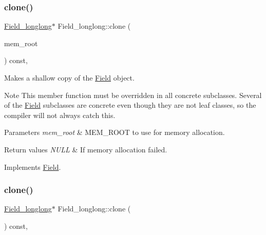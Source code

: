 \subsubsection{\texorpdfstring{clone()}{clone()}\hspace{0.1cm}{\footnotesize\ttfamily [1/2]}}
{\footnotesize\ttfamily \mbox{\hyperlink{classField__longlong}{Field\+\_\+longlong}}$\ast$ Field\+\_\+longlong\+::clone (\begin{DoxyParamCaption}\item[{M\+E\+M\+\_\+\+R\+O\+OT $\ast$}]{mem\+\_\+root }\end{DoxyParamCaption}) const\hspace{0.3cm}{\ttfamily [inline]}, {\ttfamily [virtual]}}

Makes a shallow copy of the \mbox{\hyperlink{classField}{Field}} object.

\begin{DoxyNote}{Note}
This member function must be overridden in all concrete subclasses. Several of the \mbox{\hyperlink{classField}{Field}} subclasses are concrete even though they are not leaf classes, so the compiler will not always catch this.
\end{DoxyNote}

\begin{DoxyParams}{Parameters}
{\em mem\+\_\+root} & M\+E\+M\+\_\+\+R\+O\+OT to use for memory allocation. \\
\hline
\end{DoxyParams}

\begin{DoxyRetVals}{Return values}
{\em N\+U\+LL} & If memory allocation failed. \\
\hline
\end{DoxyRetVals}


Implements \mbox{\hyperlink{classField_a64979bcb9345803b031fff76a0c3d9fe}{Field}}.

\mbox{\label{classField__longlong_a0b2379549b5b74daf1027b19f01f4b55}} 
\subsubsection{\texorpdfstring{clone()}{clone()}\hspace{0.1cm}{\footnotesize\ttfamily [2/2]}}
{\footnotesize\ttfamily \mbox{\hyperlink{classField__longlong}{Field\+\_\+longlong}}$\ast$ Field\+\_\+longlong\+::clone (\begin{DoxyParamCaption}{ }\end{DoxyParamCaption}) const\hspace{0.3cm}{\ttfamily [inline]}, {\ttfamily [virtual]}}

